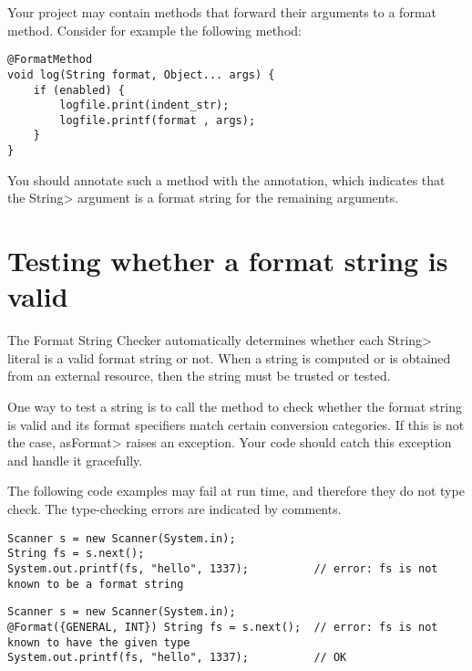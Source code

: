Your project may contain methods that forward their arguments to a format method.
Consider for example the following  method:

\begin{Verbatim}
@FormatMethod
void log(String format, Object... args) {
    if (enabled) {
        logfile.print(indent_str);
        logfile.printf(format , args);
    }
}
\end{Verbatim}

You should annotate such a method with the
 annotation,
which indicates that the \<String> argument is a format string for the
remaining arguments.


\section{Testing whether a format string is valid\label{formatter-run-time-tests}}


The Format String Checker automatically determines whether each \<String>
literal is a valid format string or not.  When a string is computed or is
obtained from an external resource, then the string must be trusted or tested.

One way to test a string is to call the
method to check whether the format string is valid and its format
specifiers match certain conversion categories.
If this is not the case, \<asFormat> raises an exception.  Your code should
catch this exception and handle it gracefully.

The following code examples may fail at run time, and therefore they do not
type check.  The type-checking errors are indicated by comments.

\begin{Verbatim}
Scanner s = new Scanner(System.in);
String fs = s.next();
System.out.printf(fs, "hello", 1337);          // error: fs is not known to be a format string
\end{Verbatim}

\begin{Verbatim}
Scanner s = new Scanner(System.in);
@Format({GENERAL, INT}) String fs = s.next();  // error: fs is not known to have the given type
System.out.printf(fs, "hello", 1337);          // OK
\end{Verbatim}

